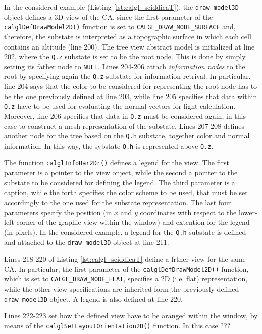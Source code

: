 In the considered example (Listing \ref{lst:calgl_sciddicaT}), the
\verb'draw_model3D' object defines a 3D view of the CA, since the
first parameter of the \verb'calglDefDrawModel2D()' function is set to
\verb'CALGL_DRAW_MODE_SURFACE' and, therefore, the substate is
interpreted as a topographic surface in which each cell contains an
altitude (line 200). The tree view abstract model is initialized at
line 202, where the \verb'Q.z' substate is set to be the root
node. This is done by simply setting its father node to
\verb'NULL'. Lines 204-206 attach \emph{information nodes} to the root
by specifying again the \verb'Q.z' substate for information
retrival. In particular, line 204 says that the color to be considered
for representing the root node has to be the one previously defined at
line 203, while line 205 specifies that data within \verb'Q.z' have to
be used for evaluating the normal vectors for light
calculation. Moreover, line 206 specifies that data in \verb'Q.z' must
be considered again, in this case to construct a mesh representation
of the substate. Lines 207-208 defines another node for the tree based
on the \verb'Q.h' substate, together color and normal information. In
this way, the sybstate \verb'Q.h' is represented above \verb'Q.z'.

The function \verb'calglInfoBar2Dr()' defines a legend for the
view. The first parameter is a pointer to the view onject, while the
second a pointer to the substate to be considered for defining the
legend. The third parameter is a caption, while the forth specifies
the color scheme to be used, that must be set accordingly to the one
used for the substate representation. The last four parameters specify
the position (in $x$ and $y$ coordinates with respect to the
lower-left corner of the graphic view within the window) and extention
for the legend (in pixels). In the considered example, a legend for
the \verb'Q.h' substate is defined and attached to the
\verb'draw_model3D' object at line 211.

Lines 218-220 of Listing \ref{lst:calgl_sciddicaT} define a frther
view for the same CA. In particular, the first parameter of the
\verb'calglDefDrawModel2D()' function, which is set to
\verb'CALGL_DRAW_MODE_FLAT', specifies a 2D (i.e. flat)
representation, while the other view specifications are inherited form
the previously defined \verb'draw_model3D' object. A legend is also defined at line 220.

Lines 222-223 set how the defined view have to be aranged within the
window, by means of the \verb'calglSetLayoutOrientation2D()' function. In this case ???

